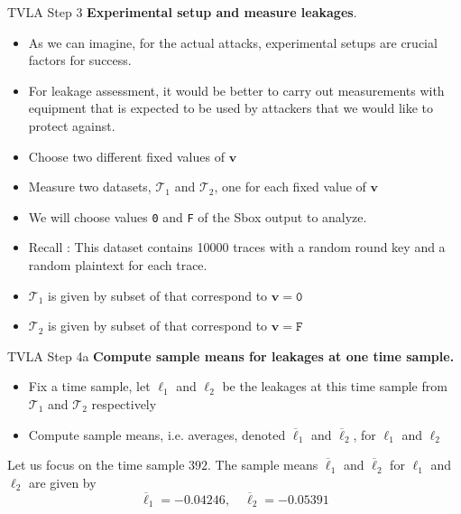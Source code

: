 \begin{frame}{TVLA Step 3}
    \textbf{Experimental setup and measure leakages}.
    \begin{itemize}
        \item As we can imagine, for the actual attacks, experimental setups are crucial factors for success.
        \item For leakage assessment, it would be better to carry out measurements with equipment that is expected to be used by attackers that we would like to protect against.
        \item Choose two different fixed values of $\boldsymbol{v}$
        \item Measure two datasets, $\mathcal{T}_1$ and $\mathcal{T}_2$, one for each fixed value of $\boldsymbol{v}$
    \end{itemize}
    \begin{example}
    \begin{itemize}
        \item We will choose values \texttt{0} and \texttt{F} of the Sbox output to analyze.
        \item Recall \datarantwo: This dataset contains 10000 traces with a random round key and a random plaintext for each trace.
        \item $\mathcal{T}_1$ is given by subset of \datarantwo that correspond to $\boldsymbol{v}=\texttt{0}$
        \item $\mathcal{T}_2$ is given by subset of \datarantwo that correspond to $\boldsymbol{v}=\texttt{F}$
    \end{itemize}
    \end{example}
\end{frame}

\begin{frame}{TVLA Step 4a}
    \textbf{Compute sample means for leakages at one time sample.}
    \begin{itemize}
        \item Fix a time sample, let $\ell_1$ and $\ell_2$ be the leakages at this time sample from $\mathcal{T}_1$ and $\mathcal{T}_2$ respectively
        \item Compute sample means, i.e. averages, denoted $\overline{\ell}_1$ and $\overline{\ell}_2$, for $\ell_1$ and $\ell_2$
    \end{itemize}
    \begin{example}
        Let us focus on the time sample $392$.
        The sample means $\overline{\ell}_1$ and $\overline{\ell}_2$ for $\ell_1$ and $\ell_2$ are given by
        \[
        \overline{\ell}_1 = -0.04246,\quad \overline{\ell}_2=-0.05391
        \]
    \end{example}
\end{frame}

